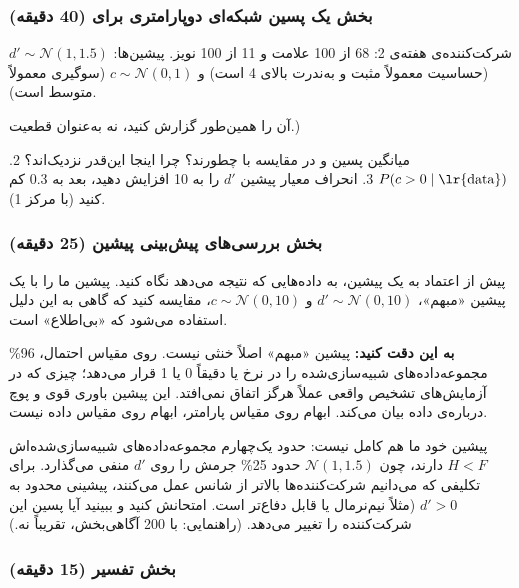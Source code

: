 \subsubsection{\texorpdfstring{بخش  یک پسین شبکه‌ای دوپارامتری
برای  (40
دقیقه)}{بخش C: یک پسین شبکه‌ای دوپارامتری برای SDT (40 دقیقه)}}

شرکت‌کننده‌ی هفته‌ی 2: 68  از 100  علامت و 11  از 100  نویز. پیشین‌ها: \(d' \sim \mathcal{N}(1, 1.5)\)
(حساسیت معمولاً مثبت و به‌ندرت بالای 4 است) و \(c \sim \mathcal{N}(0, 1)\)
(سوگیری معمولاً متوسط است).

آن را همین‌طور گزارش کنید، نه به‌عنوان قطعیت.)

میانگین پسین و  در مقایسه با  چطورند؟ چرا اینجا این‌قدر
نزدیک‌اند؟ 2. \(P(c > 0 \mid \text{\lr{data}})\) 3. انحراف معیار پیشین \(d'\)
را به 10 افزایش دهید، بعد به 0.3 کم کنید (با مرکز 1).

\subsubsection{\texorpdfstring{بخش  بررسی‌های پیش‌بینی پیشین (25
دقیقه)}{بخش D: بررسی‌های پیش‌بینی پیشین (25 دقیقه)}}

پیش از اعتماد به یک پیشین، به داده‌هایی که نتیجه می‌دهد نگاه کنید. پیشین
ما را با یک پیشین «مبهم»، \(d' \sim \mathcal{N}(0, 10)\) و
\(c \sim \mathcal{N}(0, 10)\)، مقایسه کنید که گاهی به این دلیل استفاده
می‌شود که «بی‌اطلاع» است.

\textbf{به این دقت کنید:} پیشین «مبهم» اصلاً خنثی نیست. روی مقیاس احتمال،
96\% مجموعه‌داده‌های شبیه‌سازی‌شده را در نرخ  یا 
دقیقاً 0 یا 1 قرار می‌دهد؛ چیزی که در آزمایش‌های تشخیص واقعی عملاً هرگز
اتفاق نمی‌افتد. این پیشین باوری قوی و پوچ درباره‌ی داده بیان می‌کند. ابهام
روی مقیاس پارامتر، ابهام روی مقیاس داده نیست.

پیشین خود ما هم کامل نیست: حدود یک‌چهارم مجموعه‌داده‌های شبیه‌سازی‌شده‌اش
\(H < F\) دارند، چون \(\mathcal{N}(1, 1.5)\) حدود 25\% جرمش را روی
\(d'\) منفی می‌گذارد. برای تکلیفی که می‌دانیم شرکت‌کننده‌ها بالاتر از شانس
عمل می‌کنند، پیشینی محدود به \(d' > 0\) (مثلاً نیم‌نرمال یا 
قابل دفاع‌تر است. امتحانش کنید و ببینید آیا پسین این شرکت‌کننده را تغییر
می‌دهد. (راهنمایی: با 200  آگاهی‌بخش، تقریباً نه.)

\subsubsection{\texorpdfstring{بخش  تفسیر (15
دقیقه)}{بخش E: تفسیر (15 دقیقه)}}

